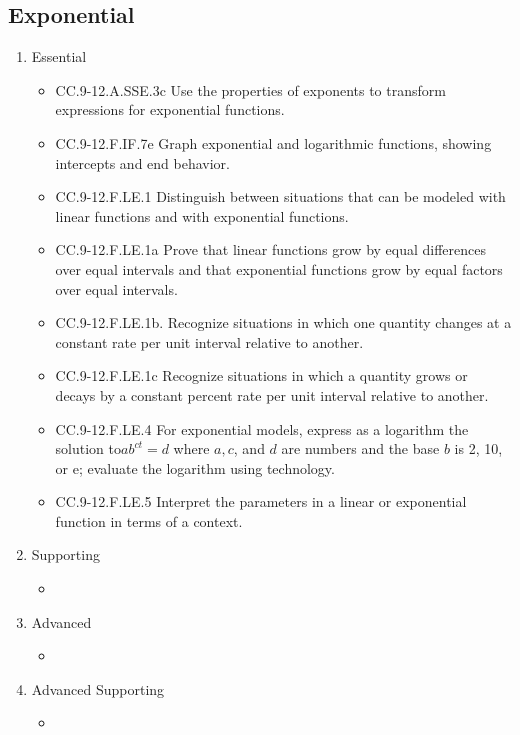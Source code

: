 \documentclass{article}
\begin{document}
\subsection*{Exponential}
\begin{enumerate}
	\item Essential
	\begin{itemize}
		\item CC.9-12.A.SSE.3c Use the properties of exponents to transform expressions for exponential functions.
		\item CC.9-12.F.IF.7e Graph exponential and logarithmic functions, showing intercepts and end behavior.
		\item CC.9-12.F.LE.1  Distinguish between situations that can be modeled with linear functions and with exponential functions.
		\item CC.9-12.F.LE.1a Prove that linear functions grow by equal differences over equal intervals and that exponential functions grow by equal factors over equal intervals.
		\item CC.9-12.F.LE.1b. Recognize situations in which one quantity changes at a constant rate per unit interval relative to another.
		\item CC.9-12.F.LE.1c Recognize situations in which a quantity grows or decays by a constant percent rate per unit interval relative to another.
		\item CC.9-12.F.LE.4 For exponential models, express as a logarithm the solution to$ ab^{ct} = d$ where $a, c$, and $d$ are numbers and the base $b$ is 2, 10, or e; evaluate the logarithm using technology.
		\item CC.9-12.F.LE.5  Interpret the parameters in a linear or exponential function in terms of a context.
	\end{itemize}		
	\item Supporting
	\begin{itemize}
		\item
	\end{itemize}
	\item Advanced
	\begin{itemize}
		\item
	\end{itemize}
	\item Advanced Supporting
	\begin{itemize}
		\item
	\end{itemize}
\end{enumerate}
\end{document}
